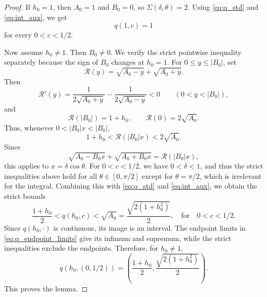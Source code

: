 \documentclass[10pt,a4paper]{amsart}
\begin{document}
\begin{proof}
If $h_0=1$, then $A_0=1$ and $B_0=0$, so $\Sigma(\delta,\theta)=2$. Using
\eqref{eq:q_std} and \eqref{eq:int_aux}, we get
\[
q(1,c)=1
\]
for every $0<c<1/2$.

Now assume $h_0\neq1$. Then $B_0\neq0$. We verify the strict pointwise
inequality separately because the sign of $B_0$ changes at $h_0=1$.  For
$0\le y\le |B_0|$, set
\[
\mathcal R(y)=\sqrt{A_0-y}+\sqrt{A_0+y}.
\]
Then
\[
\mathcal R'(y)=\frac{1}{2\sqrt{A_0+y}}-\frac{1}{2\sqrt{A_0-y}}<0
\qquad(0<y<|B_0|),
\]
and
\[
\mathcal R(|B_0|)=1+h_0,
\qquad
\mathcal R(0)=2\sqrt{A_0}.
\]
Thus, whenever $0<|B_0|x<|B_0|$,
\[
1+h_0<\mathcal R(|B_0|x)<2\sqrt{A_0}.
\]
Since
\[
\sqrt{A_0-B_0x}+\sqrt{A_0+B_0x}=\mathcal R(|B_0|x),
\]
this applies to $x=\delta\cos\theta$.  For $0<c<1/2$, we have $0<\delta<1$, and thus the strict
inequalities above hold for all $\theta\in[0,\pi/2]$ except for
$\theta=\pi/2$, which is irrelevant for the integral. Combining this with
\eqref{eq:q_std} and
\eqref{eq:int_aux}, we obtain the strict bounds
\[
\frac{1+h_0}{2}
<
q(h_0,c)
<
\sqrt{A_0}
=
\frac{\sqrt{2(1+h_0^2)}}{2},\quad \text{for}\quad 0<c<1/2.
\]
Since $q(h_0,\cdot)$ is continuous, its image is an interval.  The endpoint limits in \eqref{eq:q_endpoint_limits} give its infimum and
supremum, while the strict inequalities exclude the endpoints. Therefore, for $h_0\neq1$,
\[
q(h_0,(0,1/2))
=
\left(
\frac{1+h_0}{2},
\frac{\sqrt{2(1+h_0^2)}}{2}
\right).
\]
This proves the lemma.
\end{proof}
\end{document}
